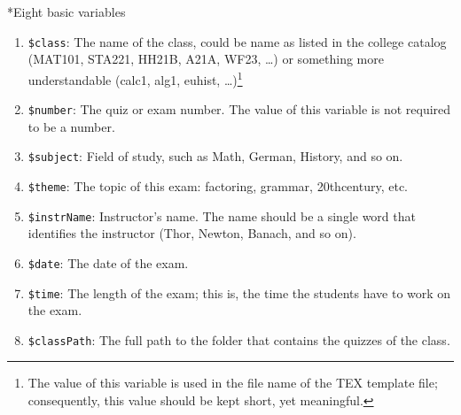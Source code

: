 \documentclass{article}
\makeatletter
\def\dtt#1{\texttt{\$#1}}
\renewcommand{\paragraph}
    {\@startsection{paragraph}{4}{0pt}{6pt}{-3pt}{\bfseries}}
\makeatother
\begin{document}
\paragraph*{Eight basic variables}\label{para:eight}
\begin{enumerate}
  \item \dtt{class}: The name of the class, could be name as
      listed in the college catalog (MAT101, STA221, HH21B,
      A21A, WF23, \dots) or something more understandable (calc1,
      alg1, euhist, \dots)\footnote{The value of this variable is used in the file name
      of the TEX template file; consequently, this value should be kept short, yet meaningful.}

  \item \dtt{number}: The quiz or exam number. The value of
      this variable is not required to be a number.\footnotemark[\thefootnote]

  \item \dtt{subject}: Field of study, such as Math, German,
      History, and so on.\footnotemark[\thefootnote]

  \item \dtt{theme}: The topic of this exam: factoring, grammar, 20thcentury, etc.\footnotemark[\thefootnote]


  \item \dtt{instrName}: Instructor's name. The name should be
      a single word that identifies the instructor (Thor,
      Newton, Banach, and so on).\footnotemark[\thefootnote]


  \item \dtt{date}: The date of the exam.


  \item \dtt{time}: The length of the exam; this is, the time
      the students have to work on the exam.

  \item \dtt{classPath}: The full path to the folder that
      contains the quizzes of the class.

\end{enumerate}
\end{document}
